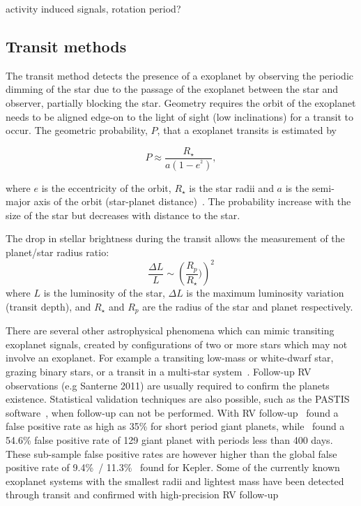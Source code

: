 activity induced signals, rotation period?

\subsection{Transit methods}
The transit method detects the presence of a exoplanet by observing the periodic dimming of the star due to the passage of the exoplanet between the star and observer, partially blocking the star.
Geometry requires the orbit of the exoplanet needs to be aligned edge-on to the light of sight (low inclinations) for a transit to occur.
The geometric probability, $P$, that a exoplanet transits is estimated by 

\begin{equation}
P \approx \frac{R_{\star}}{a(1-e^^2)},
\end{equation}

where \(e\) is the eccentricity of the orbit, $R_{\star}$ is the star radii and \(a\) is the semi-major axis of the orbit (star-planet distance)~\citep{barnes_effects_2007}.
The probability increase with the size of the star but decreases with distance to the star.

The drop in stellar brightness during the transit allows the measurement of the planet/star radius ratio:
\begin{equation}
    \frac{\Delta L}{L} \sim \left(\frac{R_p}{R_{\star}})\right)^2
\end{equation}
where \(L\) is the luminosity of the star, \(\Delta L\) is the maximum luminosity variation (transit depth), and \(R_{\star}\) and \(R_p\) are the radius of the star and planet respectively.


There are several other astrophysical phenomena which can mimic transiting exoplanet signals, created by configurations of two or more stars which may not involve an exoplanet. 
For example a transiting low-mass or white-dwarf star, grazing binary stars, or a transit in a multi-star system~\citep[e.g.][]{Cameron 2012, Santerne 2013}.
Follow-up RV observations (e.g Santerne 2011) are usually required to confirm the planets existence. 
Statistical validation techniques are also possible, such as the PASTIS software~\cite{diaz_pastis_2014}, when follow-up can not be performed.
With RV follow-up~\citet{santerne_sophie_2012} found a false positive rate as high as 35\% for short period giant planets, while~\citet{santerne_2016} found a 54.6\% false positive rate of 129 giant planet with periods less than 400 days. These sub-sample false positive rates are however higher than the global false positive rate of 9.4\%~\citep{Fressin_false_2013}/ 11.3\%~\citep{santerne_contribution_2013} found for Kepler.
Some of the currently known exoplanet systems with the smallest radii and lightest mass have been detected through transit and confirmed with high-precision RV follow-up~\citep[e.g.][]{queloz_corot7_2009, pepe_earthsized_2013, lopez-morales_kepler21b_2016, ment_second_2018}


